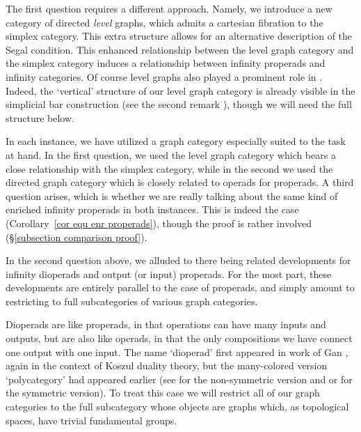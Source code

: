 \documentclass{amsart}
\numberwithin{theorem}{subsection}
\theoremstyle{definition}
\begin{document}
The first question requires a different approach. 
Namely, we introduce a new category of directed \emph{level} graphs, which admits a cartesian fibration to the simplex category. 
This extra structure allows for an alternative description of the Segal condition. 
This enhanced relationship between the level graph category and the simplex category induces a relationship between infinity properads and infinity categories.
Of course level graphs also played a prominent role in \cite{Vallette:KDP}.
Indeed, the `vertical' structure of our level graph category is already visible in the simplicial bar construction (see the second remark \cite[p.4920]{Vallette:KDP}), though we will need the full structure below.

In each instance, we have utilized a graph category especially suited to the task at hand. 
In the first question, we used the level graph category which bears a close relationship with the simplex category, while in the second we used the directed graph category which is closely related to operads for properads. 
A third question arises, which is whether we are really talking about the same kind of enriched infinity properads in both instances. 
This is indeed the case (Corollary~\ref{cor equ enr properads}), though the proof is rather involved (\S\ref{subsection comparison proof}).

In the second question above, we alluded to there being related developments for infinity dioperads and output (or input) properads.
For the most part, these developments are entirely parallel to the case of properads, and simply amount to restricting to full subcategories of various graph categories.

Dioperads are like properads, in that operations can have many inputs and outputs, but are also like operads, in that the only compositions we have connect one output with one input.
The name `dioperad' first appeared in work of Gan \cite{Gan:KDD}, again in the context of Koszul duality theory, but the many-colored version `polycategory' had appeared earlier (see \cite{Szabo:P} for the non-symmetric version and \cite[\S5.1]{Hyland:PTA} or \cite{Garner:PPDL} for the symmetric version). 
To treat this case we will restrict all of our graph categories to the full subcategory whose objects are graphs which, as topological spaces, have trivial fundamental groups.
\end{document}
